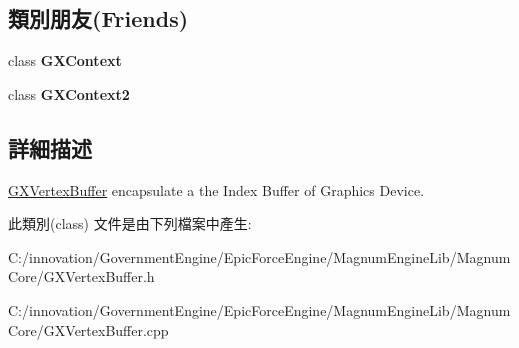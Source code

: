 \subsection*{類別朋友(Friends)}
\begin{DoxyCompactItemize}
\item 
class {\bfseries G\+X\+Context}\hypertarget{class_i_dream_sky_1_1_g_x_vertex_buffer_a2c36d7f8865080802bbad88cd73d871c}{}\label{class_i_dream_sky_1_1_g_x_vertex_buffer_a2c36d7f8865080802bbad88cd73d871c}

\item 
class {\bfseries G\+X\+Context2}\hypertarget{class_i_dream_sky_1_1_g_x_vertex_buffer_affef30b305b76ca3ae2f0759c39d9480}{}\label{class_i_dream_sky_1_1_g_x_vertex_buffer_affef30b305b76ca3ae2f0759c39d9480}

\end{DoxyCompactItemize}


\subsection{詳細描述}
\hyperlink{class_i_dream_sky_1_1_g_x_vertex_buffer}{G\+X\+Vertex\+Buffer} encapsulate a the Index Buffer of Graphics Device. 

此類別(class) 文件是由下列檔案中產生\+:\begin{DoxyCompactItemize}
\item 
C\+:/innovation/\+Government\+Engine/\+Epic\+Force\+Engine/\+Magnum\+Engine\+Lib/\+Magnum\+Core/G\+X\+Vertex\+Buffer.\+h\item 
C\+:/innovation/\+Government\+Engine/\+Epic\+Force\+Engine/\+Magnum\+Engine\+Lib/\+Magnum\+Core/G\+X\+Vertex\+Buffer.\+cpp\end{DoxyCompactItemize}
